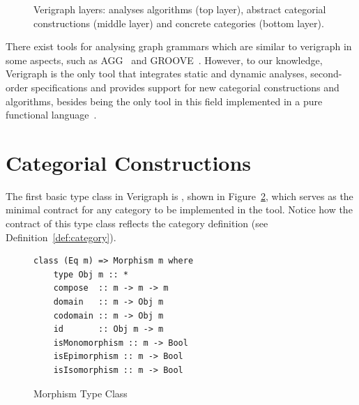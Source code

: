 \begin{figure}[!ht]
  \centering
  \caption{Verigraph layers: analyses algorithms (top layer), abstract categorial constructions (middle layer) and concrete categories (bottom layer).}\label{fig:verigraph:layers}
\end{figure}

There exist tools for analysing graph grammars which are similar to verigraph in some aspects, such as AGG~\cite{Taentzer2000} and GROOVE~\cite{Rensink2004}. However, to our knowledge, Verigraph is the only tool that integrates static and dynamic analyses, second-order specifications and provides support for new categorial constructions and algorithms, besides being the only tool in this field implemented in a pure functional language~\cite{Costa2016}.

\section{Categorial Constructions}

The first basic type class in Verigraph is , shown in Figure~\ref{fig:verigraph:morphism-type-class}, which serves as the minimal contract for any category to be implemented in the tool. Notice how the contract of this type class reflects the category definition (see Definition~\ref{def:category}).

\begin{figure}[!ht]
\caption{Morphism Type Class}
\begin{verbatim}
class (Eq m) => Morphism m where
    type Obj m :: *
    compose  :: m -> m -> m
    domain   :: m -> Obj m
    codomain :: m -> Obj m
    id       :: Obj m -> m
    isMonomorphism :: m -> Bool
    isEpimorphism :: m -> Bool
    isIsomorphism :: m -> Bool
\end{verbatim}
\label{fig:verigraph:morphism-type-class}
\end{figure}

